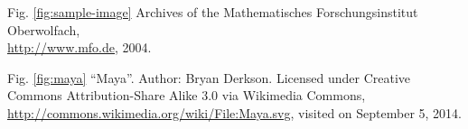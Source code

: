 \documentclass{snapshotmfo}
\begin{document}
\begin{imagecredits}
  \item[Fig. \ref{fig:sample-image}] Archives of the Mathematisches Forschungsinstitut Oberwolfach,\\\url{http://www.mfo.de}, 2004.
  \item[Fig. \ref{fig:maya}] ``Maya''. Author: Bryan Derkson. Licensed under Creative Commons Attribution-Share Alike 3.0 via Wikimedia Commons, \url{http://commons.wikimedia.org/wiki/File:Maya.svg}, visited on September 5, 2014.
\end{imagecredits}



%
\end{document}
